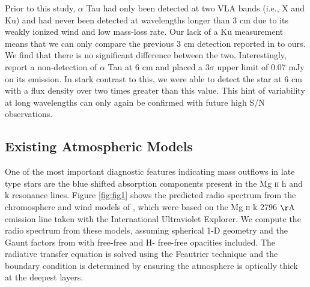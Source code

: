 \documentclass[iop]{emulateapj}
\begin{document}
Prior to this study, $\alpha$ Tau had only been detected at two VLA bands (i.e., X and Ku) and had never been detected at wavelengths longer than 3 cm due to its weakly ionized wind and low mass-loss rate. Our lack of a Ku measurement means that we can only compare the previous 3 cm detection reported in \cite{2007ApJ...655..946W} to ours. We find that there is no significant difference between the two. Interestingly, \cite{2007ApJ...655..946W} report a non-detection of $\alpha$ Tau at 6 cm and placed a 3$\sigma$ upper limit of 0.07 mJy on its emission. In stark contrast to this, we were able to detect the star at 6 cm with a flux density over two times greater than this value. This hint of variability at long wavelengths can only again be confirmed with future high S/N observations.


\subsection{Existing Atmospheric Models} \label{disc2}
One of the most important diagnostic features indicating mass outflows in late type stars are the blue shifted absorption components present in the Mg {\textsc{ii}} h and k resonance lines. Figure \ref{fig:fig1} shows the predicted radio spectrum from the chromosphere and wind models of \cite{1985pssl.proc..351D}, which were based on the Mg {\textsc{ii}} k 2796 $\rm{\AA}$ emission line taken with the International Ultraviolet Explorer. We compute the radio spectrum from these models, assuming spherical 1-D geometry and the Gaunt factors from \cite{1988ApJ...327..477H} with free-free and H- free-free opacities included. The radiative transfer equation is solved using the Feautrier technique \cite[see, e.g.,][]{1994MNRAS.268..894H} and the boundary condition is determined by ensuring the atmosphere is optically thick at the deepest layers.
\end{document}
